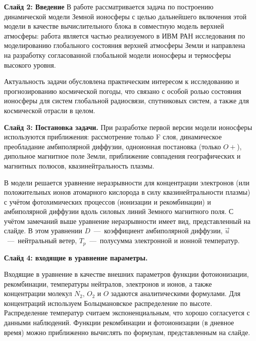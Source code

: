 \documentclass[2pt, a4paper, fleqn]{extarticle}
\begin{document}
{\bf Слайд 2: Введение}
В работе рассматривается задача по построению динамической модели Земной ионосферы с целью дальнейшего включения этой модели в качестве вычислительного блока в совместную модель верхней атмосферы: работа является частью реализуемого в ИВМ РАН исследования по моделированию глобального состояния верхней атмосферы Земли и направлена на разработку согласованной глобальной модели ионосферы и термосферы высокого уровня. 

Актуальность задачи обусловлена практическим интересом к исследованию и прогнозированию космической погоды, что связано с особой ролью состояния ионосферы для систем глобальной радиосвязи, спутниковых систем, а также для космической отрасли в целом. 

\medskip

{\bf Слайд 3: Постановка задачи.}
При разработке первой версии модели ионосферы используются приближения: рассмотрение только F слоя, динамическое преобладание амбиполярной диффузии, одноионная постановка (только $O+$), дипольное магнитное поле Земли, приближение совпадения географических и магнитных полюсов, квазинейтральность плазмы.

В модели решается уравнение неразрывности для концентрации электронов (или положительных ионов атомарного кислорода в силу квазинейтральности плазмы) с учётом фотохимических процессов (ионизации и рекомбинации) и амбиполярной диффузии вдоль силовых линий Земного магнитного поля. С учётом замечаний выше уравнение неразрывности имеет вид, представленный на слайде. В этом уравнении $D$~---~коэффициент амбиполярной диффузии, $\vec{u}$~---~нейтральный ветер, $T_p$~---~полусумма электронной и ионной температур.

\medskip

{\bf Слайд 4: входящие в уравнение параметры.}

Входящие в уравнение в качестве внешних параметров функции фотоионизации, рекомбинации, температуры нейтралов, электронов и ионов, а также концентрации молекул $N_2$, $O_2$ и $O$ задаются аналитическими формулами. Для концентраций используем Больцмановское распределение по высоте. Распределение температур считаем экспоненциальным, что хорошо согласуется с данными наблюдений. 
Функции рекомбинации и фотоионизации (в дневное время) можно приближенно вычислять по формулам, представленным на слайде.

\end{document}
